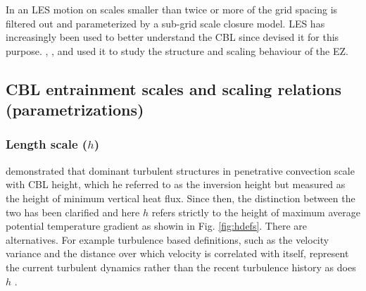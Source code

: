 In an LES motion on scales smaller than twice or more of the grid spacing is filtered out and parameterized by a sub-grid scale closure model. LES has increasingly been used to better understand the CBL since \cite{Deardorff72} devised it for this purpose.  \cite{SullMoengStev}, \cite{FedConzMir04}, \cite{EbSchu} and \cite{BrooksFowler2} used it to study the structure and scaling behaviour of the EZ.\\

\subsection{CBL entrainment scales and scaling relations (parametrizations)}
\label{subsec:scales}
\subsubsection{Length scale ($h$)}
\label{subsubsec:}

\cite{Deardorff72} demonstrated that dominant turbulent structures in penetrative convection scale with CBL height, which he referred to as the inversion height but measured as the height of minimum vertical heat flux.  Since then, the distinction between the two has been clarified \citep{SullMoengStev} and here $h$ refers strictly to the height of maximum average potential temperature gradient as showin in Fig. \ref{fig:hdefs}. There are alternatives. For example turbulence based definitions, such as the velocity variance and the distance over which velocity is correlated with itself, represent the current turbulent dynamics rather than the recent turbulence history as does $h$ \citep{Traum11}.\\

